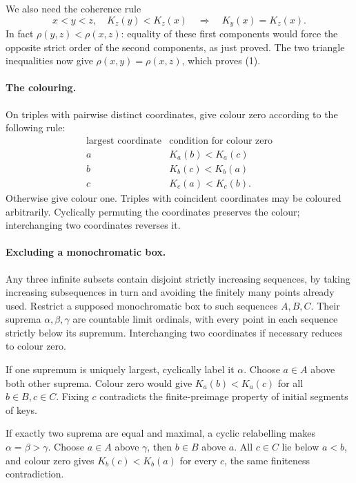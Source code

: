 We also need the coherence rule
\[
 x<y<z,\quad K_z(y)<K_z(x)
 \quad\Longrightarrow\quad K_y(x)=K_z(x).                 \tag{1}
\]
In fact \(\rho(y,z)<\rho(x,z)\): equality of these first components would force the opposite strict order of the second components, as just proved.
The two triangle inequalities now give \(\rho(x,y)=\rho(x,z)\), which proves (1).

\paragraph{The colouring.}
On triples with pairwise distinct coordinates, give colour zero according to the following rule:
\[
 \begin{array}{c|c}
 \text{largest coordinate}&\text{condition for colour zero}\\ \hline
 a&K_a(b)<K_a(c)\\
 b&K_b(c)<K_b(a)\\
 c&K_c(a)<K_c(b).
 \end{array}
\]
Otherwise give colour one. Triples with coincident coordinates may be coloured arbitrarily.
Cyclically permuting the coordinates preserves the colour; interchanging two coordinates reverses it.

\paragraph{Excluding a monochromatic box.}
Any three infinite subsets contain disjoint strictly increasing sequences, by taking increasing subsequences in turn and avoiding the finitely many points already used. Restrict a supposed monochromatic box to such sequences \(A,B,C\). Their suprema \(\alpha,\beta,\gamma\) are countable limit ordinals, with every point in each sequence strictly below its supremum.
Interchanging two coordinates if necessary reduces to colour zero.

If one supremum is uniquely largest, cyclically label it \(\alpha\). Choose \(a\in A\) above both other suprema. Colour zero would give \(K_a(b)<K_a(c)\) for all \(b\in B,c\in C\). Fixing \(c\) contradicts the finite-preimage property of initial segments of keys.

If exactly two suprema are equal and maximal, a cyclic relabelling makes \(\alpha=\beta>\gamma\). Choose \(a\in A\) above \(\gamma\), then \(b\in B\) above \(a\). All \(c\in C\) lie below \(a<b\), and colour zero gives \(K_b(c)<K_b(a)\) for every \(c\), the same finiteness contradiction.

